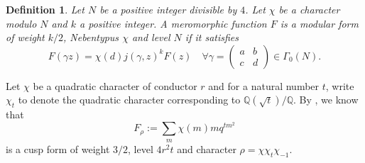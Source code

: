 \documentclass{amsart}
\newtheorem{definition}[theorem]{Definition}
\numberwithin{equation}{section}
\theoremstyle{remark}
\newcommand{\Q}{\mathbb{Q}}
\theoremstyle{plain} %
\begin{document}
\begin{definition}
Let $N$ be a positive integer divisible by $4$.
Let $\chi$ be a character modulo $N$ and $k$ a positive integer.
A meromorphic function $F$ is a modular form of weight $k/2$, Nebentypus $\chi$ and level $N$ if it satisfies
\[
F(\gamma z)=\chi(d)j(\gamma,z)^k F(z)\quad\forall \gamma=\begin{pmatrix} a&b\\c&d\end{pmatrix}\in \Gamma_0(N).
\]
\end{definition}

Let $\chi$ be a quadratic character of conductor $r$ and for a natural number $t$, write $\chi_t$ to denote the quadratic character corresponding to $\Q(\sqrt{t})/\Q$.
By \cite[Proposition~2.2]{shimura}, we know that 
\[
F_\rho:=\sum_m \chi(m)mq^{tm^2}
\]
is a cusp form of weight $3/2$, level $4r^2t$ and character $\rho = \chi \chi_t\chi_{-1}$.
\end{document}
